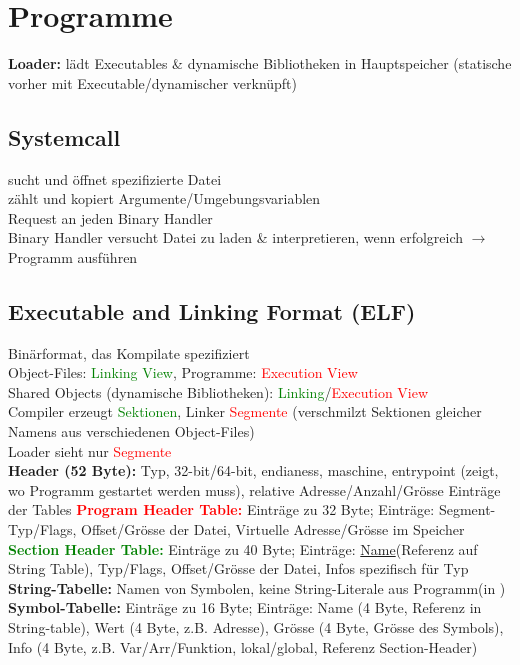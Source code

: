 \section{Programme}
\textbf{Loader: }lädt Executables \& dynamische Bibliotheken in Hauptspeicher (statische vorher mit Executable/dynamischer verknüpft)

\subsection{Systemcall }
sucht und öffnet spezifizierte Datei\\
zählt und kopiert Argumente/Umgebungsvariablen\\
Request an jeden Binary Handler\\
Binary Handler versucht Datei zu laden \& interpretieren, wenn erfolgreich $\rightarrow$ Programm ausführen

\subsection{Executable and Linking Format (ELF)}
Binärformat, das Kompilate spezifiziert\\
Object-Files: \textcolor{green}{Linking View}, Programme: \textcolor{red}{Execution View}\\
Shared Objects (dynamische Bibliotheken): \textcolor{green}{Linking}/\textcolor{red}{Execution View}\\
Compiler erzeugt \textcolor{green}{Sektionen}, Linker \textcolor{red}{Segmente} (verschmilzt Sektionen gleicher Namens aus verschiedenen Object-Files)\\
Loader sieht nur \textcolor{red}{Segmente}\\
\textbf{Header (52 Byte):} Typ, 32-bit/64-bit, endianess, maschine, entrypoint (zeigt, wo Programm gestartet werden muss), relative Adresse/Anzahl/Grösse Einträge der Tables
\textcolor{red}{\textbf{Program Header Table:}} Einträge zu 32 Byte; Einträge: Segment-Typ/Flags, Offset/Grösse der Datei, Virtuelle Adresse/Grösse im Speicher\\
\textcolor{green}{\textbf{Section Header Table:}} Einträge zu 40 Byte; Einträge: \underline{Name}(Referenz auf String Table), Typ/Flags, Offset/Grösse der Datei, Infos spezifisch für Typ\\
\textbf{String-Tabelle:} Namen von Symbolen, keine String-Literale aus Programm(in )\\
\textbf{Symbol-Tabelle:} Einträge zu 16 Byte; Einträge: Name (4 Byte, Referenz in String-table), Wert (4 Byte, z.B. Adresse), Grösse (4 Byte, Grösse des Symbols), Info (4 Byte, z.B. Var/Arr/Funktion, lokal/global, Referenz Section-Header)


